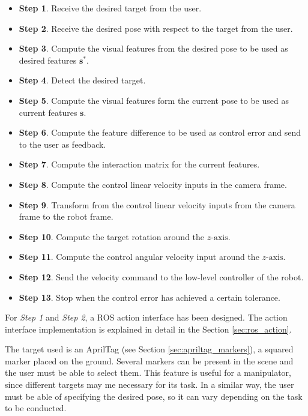 \begin{itemize}
	\item \textbf{Step 1}. Receive the desired target from the user.
	
	\item \textbf{Step 2}. Receive the desired pose with respect to the target from the user.
	
	\item \textbf{Step 3}. Compute the visual features from the desired pose to be used as desired features $\bm{s}^\ast$.
	
	\item \textbf{Step 4}. Detect the desired target.
	
	\item \textbf{Step 5}. Compute the visual features form the current pose to be used as current features $\bm{s}$.
	
	\item \textbf{Step 6}. Compute the feature difference to be used as control error and send to the user as feedback.
	
	\item \textbf{Step 7}. Compute the interaction matrix for the current features.
	
	\item \textbf{Step 8}. Compute the control linear velocity inputs in the camera frame.
	
	\item \textbf{Step 9}. Transform from the control linear velocity inputs from the camera frame to the robot frame.
	
	\item \textbf{Step 10}. Compute the target rotation around the $z\text{-axis}$.
	
	\item \textbf{Step 11}. Compute the control angular velocity input around the $z\text{-axis}$.
	
	\item \textbf{Step 12}. Send the velocity command to the low-level controller of the robot.
	
	\item \textbf{Step 13}. Stop when the control error has achieved a certain tolerance.
\end{itemize}
	
For \emph{Step 1} and \emph{Step 2}, a ROS action interface has been designed. The action interface implementation is explained in detail in the Section \ref{sec:ros_action}.	

The target used is an AprilTag (see Section \ref{sec:apriltag_markers}), a squared marker placed on the ground. Several markers can be present in the scene and the user must be able to select them. This feature is useful for a manipulator, since different targets may me necessary for its task. In a similar way, the user must be able of specifying the desired pose, so it can vary depending on the task to be conducted.

